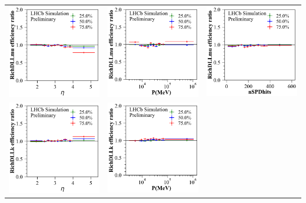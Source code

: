 \documentclass{article}
\begin{document}
\begin{tabular}{l@{\hskip -0.0in}c@{\hskip -0.0in}c}
\includegraphics[width=0.32\linewidth]{eff_ratio_RichDLLmu_vs_Brunel_ETA_at_[0.05, 0.1, 0.25, 0.5, 0.75, 0.9, 0.95].pdf} &
\includegraphics[width=0.32\linewidth]{eff_ratio_RichDLLmu_vs_Brunel_P_at_[0.05, 0.1, 0.25, 0.5, 0.75, 0.9, 0.95].pdf} &
\includegraphics[width=0.32\linewidth]{eff_ratio_RichDLLmu_vs_nSPDhits_at_[0.05, 0.1, 0.25, 0.5, 0.75, 0.9, 0.95].pdf} \\
\vspace{-0.2cm}
\includegraphics[width=0.32\linewidth]{eff_ratio_RichDLLk_vs_Brunel_ETA_at_[0.05, 0.1, 0.25, 0.5, 0.75, 0.9, 0.95].pdf} &
\includegraphics[width=0.32\linewidth]{eff_ratio_RichDLLk_vs_Brunel_P_at_[0.05, 0.1, 0.25, 0.5, 0.75, 0.9, 0.95].pdf} &

\end{tabular}
\end{document}
